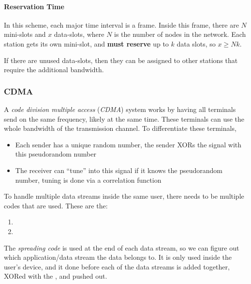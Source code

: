 \paragraph{Reservation Time}\label{par:TDMA_Reservation_Time}
In this scheme, each major time interval is a frame.
Inside this frame, there are $N$ mini-slots and $x$ data-slots, where $N$ is the number of nodes in the network.
Each station gets its own mini-slot, and \textbf{must reserve} up to $k$ data slots, so $x \geq Nk$.

If there are unused data-slots, then they can be assigned to other stations that require the additional bandwidth.

\subsubsection{CDMA}\label{subsubsec:CDMA}
\begin{definition}\label{def:CDMA}
  A \emph{code division multiple access} (\emph{CDMA}) system works by having all terminals send on the same frequency, likely at the same time.
  These terminals can use the whole bandwidth of the transmission channel.
  To differentiate these terminals,
  \begin{itemize}[noitemsep]
  \item Each sender has a unique random number, the sender XORs the signal with this pseudorandom number
  \item The receiver can ``tune'' into this signal if it knows the pseudorandom number, tuning is done via a correlation function
  \end{itemize}
\end{definition}

To handle multiple data streams inside the same user, there needs to be multiple codes that are used.
These are the:
\begin{enumerate}[noitemsep]
\item {}
\item {}
\end{enumerate}

\begin{definition}\label{def:Spreading_Code}
  The \emph{spreading code} is used at the end of each data stream, so we can figure out which application/data stream the data belongs to.
  It is only used inside the user's device, and it done before each of the data streams is added together, XORed with the , and pushed out.
\end{definition}


